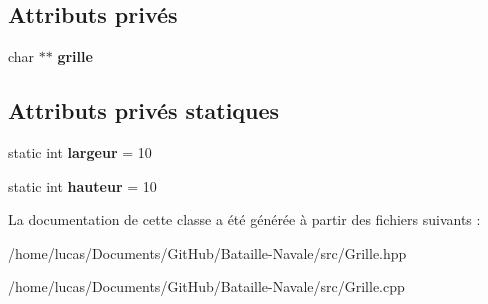 \subsection*{Attributs privés}
\begin{DoxyCompactItemize}
\item 
char $\ast$$\ast$ {\bfseries grille}\hypertarget{class_grille_abd4bc59ff38259962e5d8d3c18d1ae6b}{}\label{class_grille_abd4bc59ff38259962e5d8d3c18d1ae6b}

\end{DoxyCompactItemize}
\subsection*{Attributs privés statiques}
\begin{DoxyCompactItemize}
\item 
static int {\bfseries largeur} = 10\hypertarget{class_grille_a12252fd7e371af35a0afa6bb12aa4046}{}\label{class_grille_a12252fd7e371af35a0afa6bb12aa4046}

\item 
static int {\bfseries hauteur} = 10\hypertarget{class_grille_a150412fc1212ec2624c2a62040d5ff88}{}\label{class_grille_a150412fc1212ec2624c2a62040d5ff88}

\end{DoxyCompactItemize}


La documentation de cette classe a été générée à partir des fichiers suivants \+:\begin{DoxyCompactItemize}
\item 
/home/lucas/\+Documents/\+Git\+Hub/\+Bataille-\/\+Navale/src/Grille.\+hpp\item 
/home/lucas/\+Documents/\+Git\+Hub/\+Bataille-\/\+Navale/src/Grille.\+cpp\end{DoxyCompactItemize}
